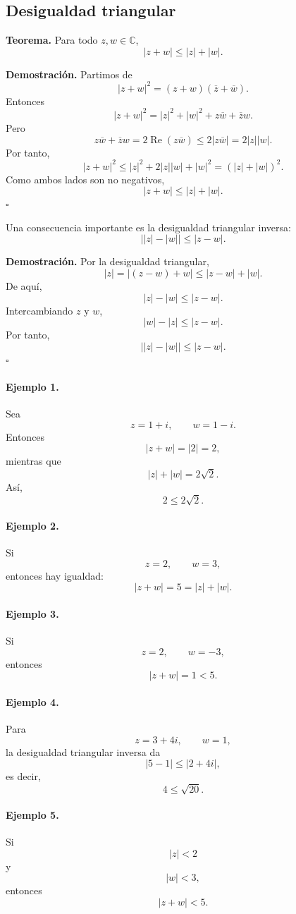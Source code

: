 \subsection{Desigualdad triangular}

\textbf{Teorema.}
Para todo $z,w\in\mathbb{C}$,
\[
\boxed{
|z+w|
\leq
|z|+|w|.
}
\]

\textbf{Demostración.}
Partimos de
\[
|z+w|^2
=
(z+w)(\overline z+\overline w).
\]
Entonces
\[
|z+w|^2
=
|z|^2+|w|^2+z\overline w+\overline z w.
\]
Pero
\[
z\overline w+\overline z w
=
2\operatorname{Re}(z\overline w)
\leq
2|z\overline w|
=
2|z||w|.
\]
Por tanto,
\[
|z+w|^2
\leq
|z|^2+2|z||w|+|w|^2
=
(|z|+|w|)^2.
\]
Como ambos lados son no negativos,
\[
|z+w|\leq |z|+|w|.
\]
\hfill$\square$

Una consecuencia importante es la desigualdad triangular inversa:
\[
\boxed{
\bigl||z|-|w|\bigr|
\leq
|z-w|.
}
\]

\textbf{Demostración.}
Por la desigualdad triangular,
\[
|z|
=
|(z-w)+w|
\leq
|z-w|+|w|.
\]
De aquí,
\[
|z|-|w|
\leq
|z-w|.
\]
Intercambiando $z$ y $w$,
\[
|w|-|z|
\leq
|z-w|.
\]
Por tanto,
\[
\bigl||z|-|w|\bigr|
\leq
|z-w|.
\]
\hfill$\square$

\paragraph{Ejemplo 1.}
Sea
\[
z=1+i,
\qquad
w=1-i.
\]
Entonces
\[
|z+w|
=
|2|
=
2,
\]
mientras que
\[
|z|+|w|
=
2\sqrt2.
\]
Así,
\[
2\leq2\sqrt2.
\]

\paragraph{Ejemplo 2.}
Si
\[
z=2,
\qquad
w=3,
\]
entonces hay igualdad:
\[
|z+w|=5=|z|+|w|.
\]

\paragraph{Ejemplo 3.}
Si
\[
z=2,
\qquad
w=-3,
\]
entonces
\[
|z+w|=1<5.
\]

\paragraph{Ejemplo 4.}
Para
\[
z=3+4i,
\qquad
w=1,
\]
la desigualdad triangular inversa da
\[
\bigl|5-1\bigr|
\leq
|2+4i|,
\]
es decir,
\[
4\leq\sqrt{20}.
\]

\paragraph{Ejemplo 5.}
Si
\[
|z|<2
\]
y
\[
|w|<3,
\]
entonces
\[
|z+w|
<
5.
\]

